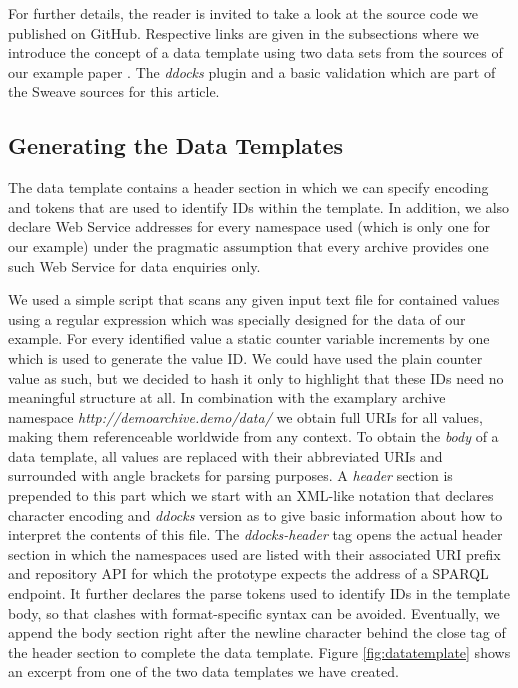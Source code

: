 \documentclass{acm_proc_article-sp}
\begin{document}
For further details, the reader is invited to take a look at the source code we published on GitHub.
Respective links are given in the subsections
where we introduce the concept of a data template using two data sets from the sources of our example paper \cite{KoenkerZeileis2009}. 
The \textit{ddocks} plugin and a basic validation which are part of the Sweave sources for this article.


\subsection{Generating the Data Templates}

The data template contains a header section in which we can specify encoding and tokens that are used to identify IDs within the template.
In addition, we also declare Web Service addresses for every namespace used (which is only one for our example) under the pragmatic assumption that every archive provides one such Web Service for data enquiries only.


We used a simple script that scans any given input text file for contained values using a regular expression which was specially designed for the data of our example.
For every identified value a static counter variable increments by one which is used to generate the value ID.
We could have used the plain counter value as such, but we decided to hash it only to highlight that these IDs need no meaningful structure at all.
In combination with the examplary archive namespace \textit{http://demoarchive.demo/data/} we obtain full URIs for all values, making them referenceable worldwide from any context.
To obtain the \textit{body} of a data template, all values are replaced with their abbreviated URIs and surrounded with angle brackets for parsing purposes.
A \textit{header} section is prepended to this part which we start with an XML-like notation that declares character encoding and \textit{ddocks} version as to give basic information about how to interpret the contents of this file.
The \textit{ddocks-header} tag opens the actual header section in which the namespaces used are listed with their associated URI prefix and repository API for which the prototype expects the address of a SPARQL endpoint.
It further declares the parse tokens used to identify IDs in the template body, so that clashes with format-specific syntax can be avoided.
Eventually, we append the body section right after the newline character behind the close tag of the header section to complete the data template.
Figure \ref{fig:datatemplate} shows an excerpt from one of the two data templates we have created.
\end{document}
